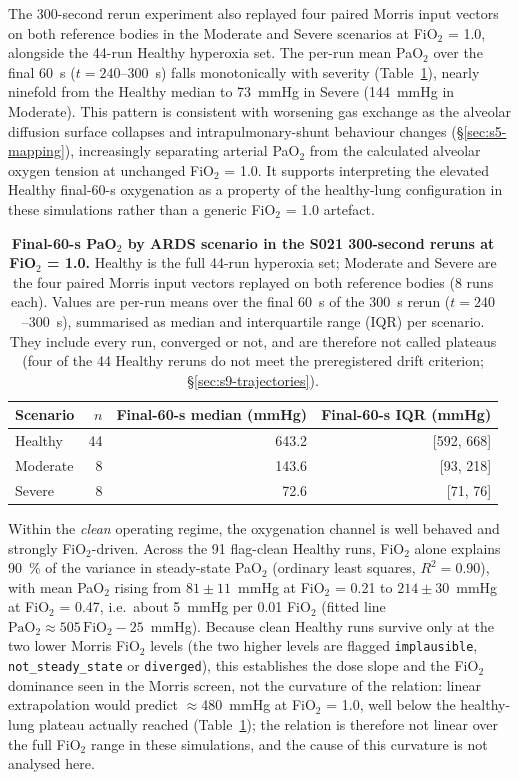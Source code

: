 \documentclass[pdflatex,sn-nature]{sn-jnl}%
\begin{document}
The 300-second rerun experiment also replayed four paired Morris input vectors on both reference bodies in the Moderate and Severe scenarios at FiO$_2$ = 1.0, alongside the 44-run Healthy hyperoxia set. The per-run mean PaO$_2$ over the final 60~s ($t = 240$--$300$~s) falls monotonically with severity (Table~\ref{tab:s9-shunt}), nearly ninefold from the Healthy median to 73~mmHg in Severe (144~mmHg in Moderate). This pattern is consistent with worsening gas exchange as the alveolar diffusion surface collapses and intrapulmonary-shunt behaviour changes (\S\ref{sec:s5-mapping}), increasingly separating arterial PaO$_2$ from the calculated alveolar oxygen tension at unchanged FiO$_2$ = 1.0. It supports interpreting the elevated Healthy final-60-s oxygenation as a property of the healthy-lung configuration in these simulations rather than a generic FiO$_2$ = 1.0 artefact.

\begin{table}[htbp]
\centering
\caption{\textbf{Final-60-s PaO$_2$ by ARDS scenario in the S021 300-second reruns at FiO$_2$ = 1.0.} Healthy is the full 44-run hyperoxia set; Moderate and Severe are the four paired Morris input vectors replayed on both reference bodies (8 runs each). Values are per-run means over the final 60~s of the 300~s rerun ($t = 240$--$300$~s), summarised as median and interquartile range (IQR) per scenario. They include every run, converged or not, and are therefore not called plateaus (four of the 44 Healthy reruns do not meet the preregistered drift criterion; \S\ref{sec:s9-trajectories}).}
\label{tab:s9-shunt}
\begin{tabular}{lrrr}
\toprule
Scenario & $n$ & Final-60-s median (mmHg) & Final-60-s IQR (mmHg) \\
\midrule
Healthy        & 44 & 643.2 & [592, 668] \\
Moderate  &  8 & 143.6 & [93, 218]  \\
Severe    &  8 &  72.6 & [71, 76]   \\
\bottomrule
\end{tabular}
\end{table}

Within the \emph{clean} operating regime, the oxygenation channel is well behaved and strongly FiO$_2$-driven. Across the 91 flag-clean Healthy runs, FiO$_2$ alone explains 90~\% of the variance in steady-state PaO$_2$ (ordinary least squares, $R^2 = 0.90$), with mean PaO$_2$ rising from $81 \pm 11$~mmHg at FiO$_2$ = 0.21 to $214 \pm 30$~mmHg at FiO$_2$ = 0.47, i.e.\ about 5~mmHg per 0.01 FiO$_2$ (fitted line $\mathrm{PaO}_2 \approx 505\,\mathrm{FiO}_2 - 25$~mmHg). Because clean Healthy runs survive only at the two lower Morris FiO$_2$ levels (the two higher levels are flagged \texttt{implausible}, \texttt{not\_steady\_state} or \texttt{diverged}), this establishes the dose slope and the FiO$_2$ dominance seen in the Morris screen, not the curvature of the relation: linear extrapolation would predict $\approx$480~mmHg at FiO$_2$ = 1.0, well below the healthy-lung plateau actually reached (Table~\ref{tab:s9-shunt}); the relation is therefore not linear over the full FiO$_2$ range in these simulations, and the cause of this curvature is not analysed here.
\end{document}
